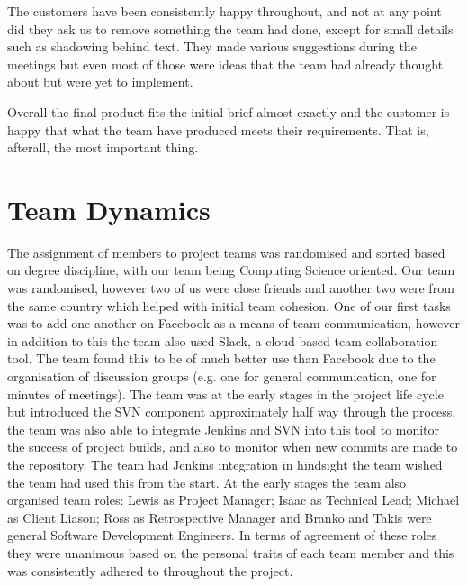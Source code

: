 \documentclass{l3proj}
\begin{document}
The customers have been consistently happy throughout, and not at any point did they ask us to remove something the team had done, except for small details such
as shadowing behind text. They made various suggestions during the meetings but even most of those were ideas that the team had already thought about but were
yet to implement.

Overall the final product fits the initial brief almost exactly and the customer is happy that what the team have produced meets their requirements. That
is, afterall, the most important thing.



\section{Team Dynamics}
\label{sec:team-dynamics}

The assignment of members to project teams was randomised and sorted based on degree discipline, with our team being
Computing Science oriented. Our team was randomised, however two of us were close friends and another two were from the
same country which helped with initial team cohesion. One of our first tasks was to add one another on Facebook as a means of
team communication, however in addition to this the team also used Slack, a cloud-based team collaboration tool. The team found this to
be of much better use than Facebook due to the organisation of discussion groups (e.g. one for general communication, one for
minutes of meetings). The team was at the early stages in the project life cycle but introduced the SVN component approximately half way
through the process, the team was also able to integrate Jenkins and SVN into this tool to monitor the success of project builds,
and also to monitor when new commits are made to the repository. The team had Jenkins integration in hindsight the team wished the team had used this from the
start. At the early stages the team also organised team roles: Lewis as Project Manager; Isaac as Technical Lead; Michael as Client Liason;
Ross as Retrospective Manager and Branko and Takis were general Software Development Engineers. In terms of agreement of these roles they were unanimous
based on the personal traits of each team member and this was consistently adhered to throughout the project.
\end{document}
